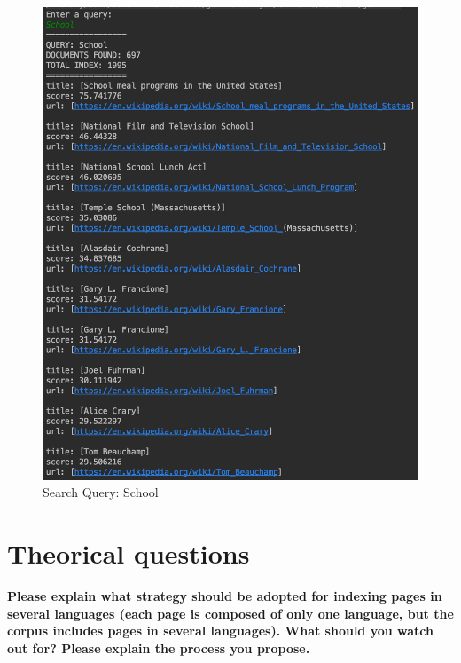 \documentclass[a4paper]{article}
\begin{document}
\begin{figure}[H]
\begin{minipage}[b]{0.4\textwidth}
    \includegraphics[width=\textwidth]{imgs/school}
    \caption{Search Query: School}
    \label{fig:school}
  \end{minipage}
\end{figure}



\section{Theorical questions}
\textbf{Please explain what strategy should be adopted for indexing pages in several languages (each page is composed of only one language, but the corpus includes pages in several languages). What should you watch out for? Please explain the process you propose.} \\
\end{document}
